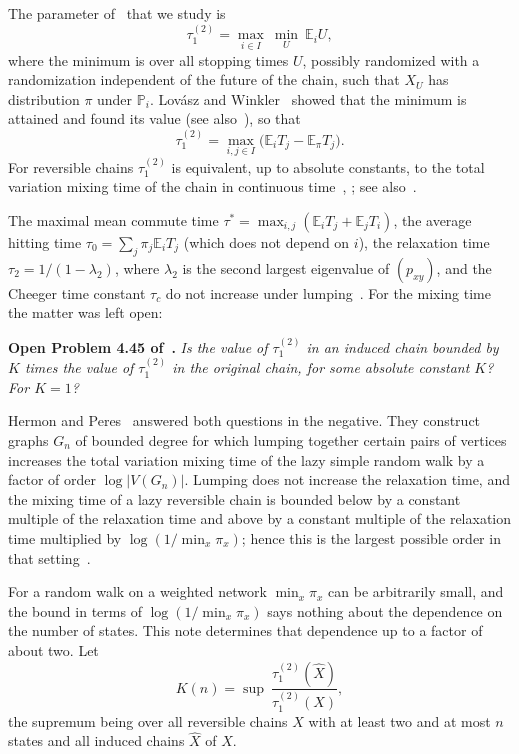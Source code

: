\documentclass[11pt]{amsart}
\theoremstyle{definition}
\newcommand{\Prob}{\mathbb{P}}
\newcommand{\E}{\mathbb{E}}
\newcommand{\tmix}{\tau_1^{(2)}}
\newcommand{\hX}{\widehat{X}}
\begin{document}
The parameter of~\cite[Chapter~4]{AF} that we study is
\[
\tmix=\max_{i\in I}\ \min_{U}\ \E_iU ,
\]
where the minimum is over all stopping times $U$, possibly randomized with a randomization independent of the future
of the chain, such that $X_U$ has distribution $\pi$ under
$\Prob_i$. Lov\'asz and Winkler~\cite{LW95} showed that the minimum is attained and found its value
(see also~\cite[Theorem~9.4]{AF}), so that
\begin{equation}\label{eq:lw}
\tmix=\max_{i,j\in I}\bigl(\E_iT_j-\E_\pi T_j\bigr).
\end{equation}
For reversible chains $\tmix$ is equivalent, up to absolute constants, to the total variation mixing time of the
chain in continuous time~\cite{Aldous82}, \cite[Theorem~4.6]{AF}; see also~\cite{LW98}.

The maximal mean commute time $\tau^*=\max_{i,j}(\E_iT_j+\E_jT_i)$, the average hitting time
$\tau_0=\sum_j\pi_j\E_iT_j$ (which does not depend on $i$), the relaxation time $\tau_2=1/(1-\lambda_2)$, where
$\lambda_2$ is the second largest eigenvalue of $(p_{xy})$, and the Cheeger time constant $\tau_c$ do not increase
under lumping~\cite[Proposition~4.44]{AF}. For the mixing time the matter was left open:

\smallskip
\noindent\textbf{Open Problem 4.45 of~\cite{AF}.} \emph{Is the value of $\tmix$ in an induced chain bounded by $K$
times the value of $\tmix$ in the original chain, for some absolute constant $K$? For $K=1$?}
\smallskip

Hermon and Peres~\cite[Theorem~3(c)]{HP} answered both questions in the negative. They construct graphs $G_n$ of
bounded degree for which lumping together certain pairs of vertices increases the total variation mixing time of the
lazy simple random walk by a factor of order $\log|V(G_n)|$. Lumping does not increase the relaxation time, and the
mixing time of a lazy reversible chain is bounded below by a constant multiple of the relaxation time and above by a
constant multiple of the relaxation time multiplied by $\log(1/\min_x\pi_x)$; hence this is the largest possible
order in that setting~\cite[Remark~1.8]{HP}.

For a random walk on a weighted network $\min_x\pi_x$ can be arbitrarily small, and the bound in terms of
$\log(1/\min_x\pi_x)$ says nothing about the dependence on the number of states. This note determines that dependence
up to a factor of about two. Let
\[
K(n)=\sup\ \frac{\tmix(\hX)}{\tmix(X)} ,
\]
the supremum being over all reversible chains $X$ with at least two and at most $n$ states and all induced chains
$\hX$ of $X$.
\end{document}
